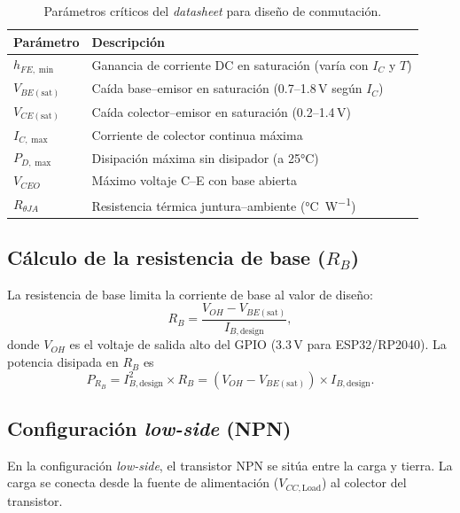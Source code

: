 \documentclass[11pt]{article}
\begin{document}
\begin{table}[H]\centering
\caption{Parámetros críticos del \emph{datasheet} para diseño de conmutación.}
\begin{tabular}{ll}
\toprule
Parámetro & Descripción \\
\midrule
$h_{FE,\min}$ & Ganancia de corriente DC en saturación (varía con $I_C$ y $T$) \\
$V_{BE(\text{sat})}$ & Caída base--emisor en saturación (0.7--1.8\,V según $I_C$) \\
$V_{CE(\text{sat})}$ & Caída colector--emisor en saturación (0.2--1.4\,V) \\
$I_{C,\max}$ & Corriente de colector continua máxima \\
$P_{D,\max}$ & Disipación máxima sin disipador (a 25\si{\celsius}) \\
$V_{CEO}$ & Máximo voltaje C--E con base abierta \\
$R_{\theta JA}$ & Resistencia térmica juntura--ambiente (\si{\celsius\per\watt}) \\
\bottomrule
\end{tabular}
\end{table}

\subsection{Cálculo de la resistencia de base ($R_B$)}
La resistencia de base limita la corriente de base al valor de diseño:
\begin{equation}
  R_B = \frac{V_{OH} - V_{BE(\text{sat})}}{I_{B,\text{design}}},
\end{equation}
donde $V_{OH}$ es el voltaje de salida alto del GPIO (3.3\,V para ESP32/RP2040). La
potencia disipada en $R_B$ es
\begin{equation}
  P_{R_B} = I_{B,\text{design}}^2\times R_B = (V_{OH}-V_{BE(\text{sat})})\times I_{B,\text{design}}.
\end{equation}

\subsection{Configuración \emph{low-side} (NPN)}
En la configuración \emph{low-side}, el transistor NPN se sitúa entre la carga y tierra.
La carga se conecta desde la fuente de alimentación ($V_{CC,\text{Load}}$) al colector
del transistor.
\end{document}
